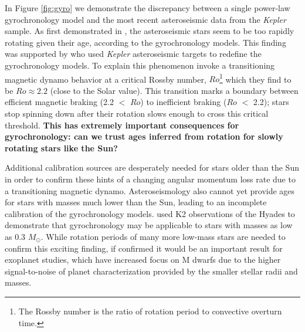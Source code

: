 \documentclass[12pt]{article}
\newcommand{\Kepler}{\textsl{Kepler}\xspace}
\begin{document}
In Figure \ref{fig:gyro} we demonstrate the discrepancy between a single
power-law gyrochronology model and the most recent asteroseismic data from
the \Kepler sample.
As first demonstrated in \citet{angus2015}, the asteroseismic stars seem to be
too rapidly rotating given their age, according to the gyrochronology models.
This finding was supported by \citet{van-saders2016} who used \Kepler
asteroseismic targets to redefine the gyrochronology models.
To explain this phenomenon \citet{van-saders2016} invoke a transitioning magnetic dynamo
behavior at a critical Rossby number, $Ro$\footnote{The Rossby number is the
ratio of rotation period to convective overturn time.} which they find to be
$Ro\approx2.2$ (close to the Solar value).
This transition marks a boundary between efficient magnetic braking (2.2 $<$
$Ro$) to inefficient braking ($Ro$ $<$ 2.2); stars stop spinning down after
their rotation slows enough to cross this critical threshold.
{\bf This has extremely important consequences for gyrochronology: can we trust
ages inferred from rotation for slowly rotating stars like the Sun?}

Additional calibration sources are desperately needed for stars older than the
Sun in order to confirm these hints of a changing angular momentum loss rate due to a transitioning magnetic dynamo.
Asteroseismology also cannot yet provide ages for stars with masses
much lower than the Sun, leading to an incomplete calibration of the gyrochronology models.
\citet{douglas2017} used K2 observations of the Hyades to demonstrate that
gyrochronology may be applicable to stars with masses as low as 0.3 $M_\odot$. While rotation periods of many more low-mass stars are needed to confirm this exciting finding, if confirmed it would be an important result for exoplanet studies,
which have increased focus on M dwarfs due to the higher signal-to-noise of planet characterization provided by the smaller stellar radii and masses.


\end{document}
